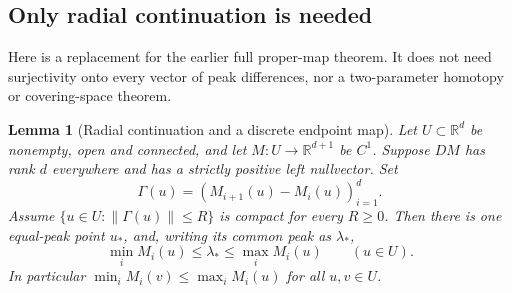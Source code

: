 \documentclass[11pt]{article}
\newcommand{\R}{\mathbb R}
\newcommand{\norm}[1]{\left\lVert#1\right\rVert}
\newtheorem{lemma}[theorem]{Lemma}
\theoremstyle{remark}\newtheorem{remark}[theorem]{Remark}
\begin{document}
\subsection{Only radial continuation is needed}
\label{polyretry:global-comparison}
\label{polyretry:proper-inverse}
Here is a replacement for the earlier full proper-map theorem. It does
not need surjectivity onto every vector of peak differences, nor a
two-parameter homotopy or covering-space theorem.

\begin{lemma}[Radial continuation and a discrete endpoint map]
\label{lem:radial}
Let $U\subset\R^d$ be nonempty, open and connected, and let
$M:U\to\R^{d+1}$ be $C^1$. Suppose $DM$ has rank $d$ everywhere and
has a strictly positive left nullvector. Set
\[
 \Gamma(u)=(M_{i+1}(u)-M_i(u))_{i=1}^d.
\]
Assume $\{u\in U:\norm{\Gamma(u)}\le R\}$ is compact for every
$R\ge0$. Then there is one equal-peak point $u_*$, and, writing its
common peak as $\lambda_*$,
\[
 \min_i M_i(u)\le\lambda_*\le\max_i M_i(u)\qquad(u\in U).
\]
In particular $\min_iM_i(v)\le\max_iM_i(u)$ for all $u,v\in U$.
\end{lemma}
\end{document}
